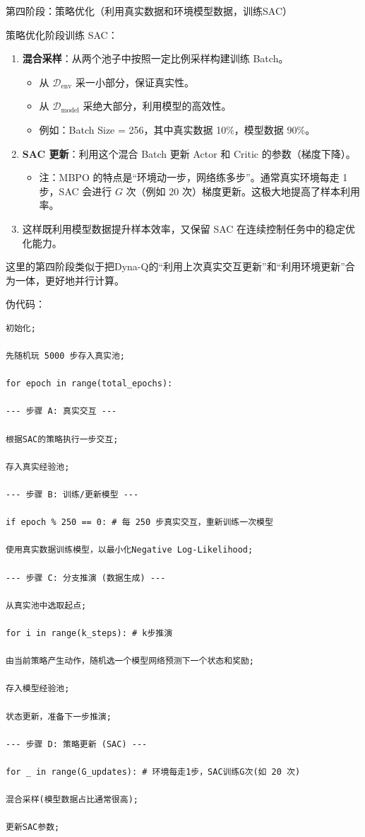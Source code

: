 第四阶段：策略优化（利用真实数据和环境模型数据，训练SAC）

策略优化阶段训练 SAC：

\begin{enumerate}
\def\labelenumi{\arabic{enumi}.}
\tightlist
\item
  \textbf{混合采样}：从两个池子中按照一定比例采样构建训练 Batch。

  \begin{itemize}
  \tightlist
  \item
    从 \(\mathcal D_{\mathrm{env}}\) 采一小部分，保证真实性。
  \item
    从 \(\mathcal D_{\mathrm{model}}\) 采绝大部分，利用模型的高效性。
  \item
    例如：Batch Size = 256，其中真实数据 10\%，模型数据 90\%。
  \end{itemize}
\item
  \textbf{SAC 更新}：利用这个混合 Batch 更新 Actor 和 Critic 的参数（梯度下降）。

  \begin{itemize}
  \tightlist
  \item
    注：MBPO 的特点是``环境动一步，网络练多步''。通常真实环境每走 1 步，SAC 会进行 \(G\) 次（例如 20 次）梯度更新。这极大地提高了样本利用率。
  \end{itemize}
\item
  这样既利用模型数据提升样本效率，又保留 SAC 在连续控制任务中的稳定优化能力。
\end{enumerate}

这里的第四阶段类似于把Dyna-Q的``利用上次真实交互更新''和``利用环境更新''合为一体，更好地并行计算。

伪代码：

\begin{verbatim}
初始化;

先随机玩 5000 步存入真实池;

for epoch in range(total_epochs):

--- 步骤 A: 真实交互 ---

根据SAC的策略执行一步交互;

存入真实经验池;

--- 步骤 B: 训练/更新模型 ---

if epoch % 250 == 0: # 每 250 步真实交互，重新训练一次模型

使用真实数据训练模型，以最小化Negative Log-Likelihood;

--- 步骤 C: 分支推演 (数据生成) ---

从真实池中选取起点;

for i in range(k_steps): # k步推演

由当前策略产生动作，随机选一个模型网络预测下一个状态和奖励;

存入模型经验池;

状态更新，准备下一步推演;

--- 步骤 D: 策略更新 (SAC) ---

for _ in range(G_updates): # 环境每走1步，SAC训练G次(如 20 次)

混合采样(模型数据占比通常很高);

更新SAC参数;
\end{verbatim}

